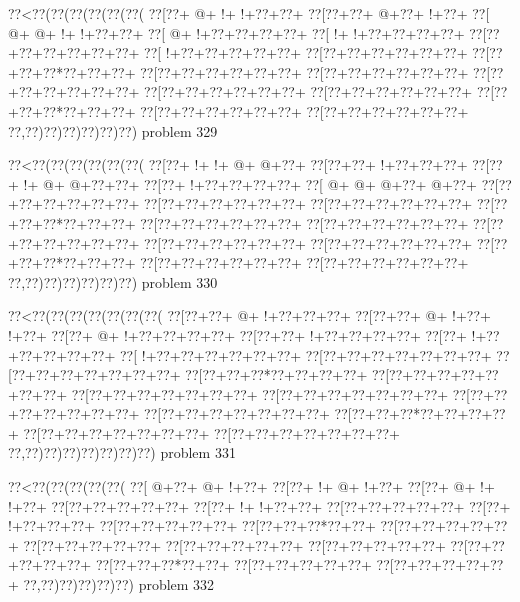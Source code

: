 \vbox{\vbox{\goo
\0??<\0??(\0??(\0??(\0??(\0??(\0??(
\0??[\0??+\- @+\- !+\- !+\0??+\0??+
\0??[\0??+\0??+\- @+\0??+\- !+\0??+
\0??[\- @+\- @+\- !+\- !+\0??+\0??+
\0??[\- @+\- !+\0??+\0??+\0??+\0??+
\0??[\- !+\- !+\0??+\0??+\0??+\0??+
\0??[\0??+\0??+\0??+\0??+\0??+\0??+
\0??[\- !+\0??+\0??+\0??+\0??+\0??+
\0??[\0??+\0??+\0??+\0??+\0??+\0??+
\0??[\0??+\0??+\0??*\0??+\0??+\0??+
\0??[\0??+\0??+\0??+\0??+\0??+\0??+
\0??[\0??+\0??+\0??+\0??+\0??+\0??+
\0??[\0??+\0??+\0??+\0??+\0??+\0??+
\0??[\0??+\0??+\0??+\0??+\0??+\0??+
\0??[\0??+\0??+\0??+\0??+\0??+\0??+
\0??[\0??+\0??+\0??*\0??+\0??+\0??+
\0??[\0??+\0??+\0??+\0??+\0??+\0??+
\0??[\0??+\0??+\0??+\0??+\0??+\0??+
\0??,\0??)\0??)\0??)\0??)\0??)\0??)
}
\hfil problem 329\hfil\break
}

\vbox{\vbox{\goo
\0??<\0??(\0??(\0??(\0??(\0??(\0??(
\0??[\0??+\- !+\- !+\- @+\- @+\0??+
\0??[\0??+\0??+\- !+\0??+\0??+\0??+
\0??[\0??+\- !+\- @+\- @+\0??+\0??+
\0??[\0??+\- !+\0??+\0??+\0??+\0??+
\0??[\- @+\- @+\- @+\0??+\- @+\0??+
\0??[\0??+\0??+\0??+\0??+\0??+\0??+
\0??[\0??+\0??+\0??+\0??+\0??+\0??+
\0??[\0??+\0??+\0??+\0??+\0??+\0??+
\0??[\0??+\0??+\0??*\0??+\0??+\0??+
\0??[\0??+\0??+\0??+\0??+\0??+\0??+
\0??[\0??+\0??+\0??+\0??+\0??+\0??+
\0??[\0??+\0??+\0??+\0??+\0??+\0??+
\0??[\0??+\0??+\0??+\0??+\0??+\0??+
\0??[\0??+\0??+\0??+\0??+\0??+\0??+
\0??[\0??+\0??+\0??*\0??+\0??+\0??+
\0??[\0??+\0??+\0??+\0??+\0??+\0??+
\0??[\0??+\0??+\0??+\0??+\0??+\0??+
\0??,\0??)\0??)\0??)\0??)\0??)\0??)
}
\hfil problem 330\hfil\break
}

\vbox{\vbox{\goo
\0??<\0??(\0??(\0??(\0??(\0??(\0??(\0??(
\0??[\0??+\0??+\- @+\- !+\0??+\0??+\0??+
\0??[\0??+\0??+\- @+\- !+\0??+\- !+\0??+
\0??[\0??+\- @+\- !+\0??+\0??+\0??+\0??+
\0??[\0??+\0??+\- !+\0??+\0??+\0??+\0??+
\0??[\0??+\- !+\0??+\0??+\0??+\0??+\0??+
\0??[\- !+\0??+\0??+\0??+\0??+\0??+\0??+
\0??[\0??+\0??+\0??+\0??+\0??+\0??+\0??+
\0??[\0??+\0??+\0??+\0??+\0??+\0??+\0??+
\0??[\0??+\0??+\0??*\0??+\0??+\0??+\0??+
\0??[\0??+\0??+\0??+\0??+\0??+\0??+\0??+
\0??[\0??+\0??+\0??+\0??+\0??+\0??+\0??+
\0??[\0??+\0??+\0??+\0??+\0??+\0??+\0??+
\0??[\0??+\0??+\0??+\0??+\0??+\0??+\0??+
\0??[\0??+\0??+\0??+\0??+\0??+\0??+\0??+
\0??[\0??+\0??+\0??*\0??+\0??+\0??+\0??+
\0??[\0??+\0??+\0??+\0??+\0??+\0??+\0??+
\0??[\0??+\0??+\0??+\0??+\0??+\0??+\0??+
\0??,\0??)\0??)\0??)\0??)\0??)\0??)\0??)
}
\hfil problem 331\hfil\break
}

\vbox{\vbox{\goo
\0??<\0??(\0??(\0??(\0??(\0??(
\0??[\- @+\0??+\- @+\- !+\0??+
\0??[\0??+\- !+\- @+\- !+\0??+
\0??[\0??+\- @+\- !+\- !+\0??+
\0??[\0??+\0??+\0??+\0??+\0??+
\0??[\0??+\- !+\- !+\0??+\0??+
\0??[\0??+\0??+\0??+\0??+\0??+
\0??[\0??+\- !+\0??+\0??+\0??+
\0??[\0??+\0??+\0??+\0??+\0??+
\0??[\0??+\0??+\0??*\0??+\0??+
\0??[\0??+\0??+\0??+\0??+\0??+
\0??[\0??+\0??+\0??+\0??+\0??+
\0??[\0??+\0??+\0??+\0??+\0??+
\0??[\0??+\0??+\0??+\0??+\0??+
\0??[\0??+\0??+\0??+\0??+\0??+
\0??[\0??+\0??+\0??*\0??+\0??+
\0??[\0??+\0??+\0??+\0??+\0??+
\0??[\0??+\0??+\0??+\0??+\0??+
\0??,\0??)\0??)\0??)\0??)\0??)
}
\hfil problem 332\hfil\break
}

